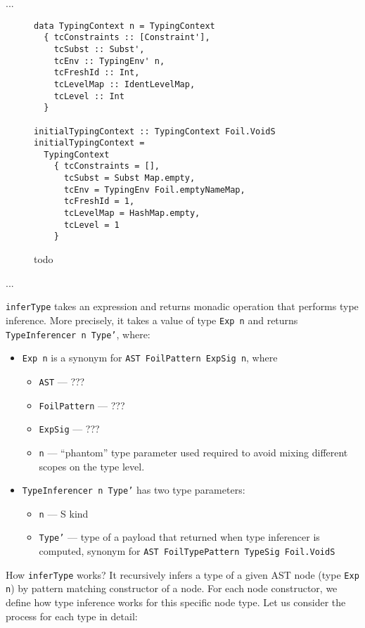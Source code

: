 ...

\begin{figure}[H]
  \begin{verbatim}
data TypingContext n = TypingContext
  { tcConstraints :: [Constraint'],
    tcSubst :: Subst',
    tcEnv :: TypingEnv' n,
    tcFreshId :: Int,
    tcLevelMap :: IdentLevelMap,
    tcLevel :: Int
  }

initialTypingContext :: TypingContext Foil.VoidS
initialTypingContext =
  TypingContext
    { tcConstraints = [],
      tcSubst = Subst Map.empty,
      tcEnv = TypingEnv Foil.emptyNameMap,
      tcFreshId = 1,
      tcLevelMap = HashMap.empty,
      tcLevel = 1
    }
  \end{verbatim}
  \caption{todo}
\end{figure}

...

\texttt{inferType} takes an expression and returns monadic operation that performs type inference. More precisely, it takes a value of type \texttt{Exp n} and returns \texttt{TypeInferencer n Type'}, where:

\begin{itemize}
  \item \texttt{Exp n} is a synonym for \texttt{AST FoilPattern ExpSig n}, where
  \begin{itemize}
    \item \texttt{AST} — ???
    \item \texttt{FoilPattern} — ???
    \item \texttt{ExpSig} — ???
    \item \texttt{n} — ``phantom'' type parameter used required to avoid mixing different scopes on the type level.
  \end{itemize}
  \item \texttt{TypeInferencer n Type'} has two type parameters:
  \begin{itemize}
    \item \texttt{n} — S kind
    \item \texttt{Type'} — type of a payload that returned when type inferencer is computed, synonym for \texttt{AST FoilTypePattern TypeSig Foil.VoidS}
  \end{itemize}
\end{itemize}

How \texttt{inferType} works? It recursively infers a type of a given AST node (type \texttt{Exp n}) by pattern matching constructor of a node. For each node constructor, we define how type inference works for this specific node type. Let us consider the process for each type in detail:

